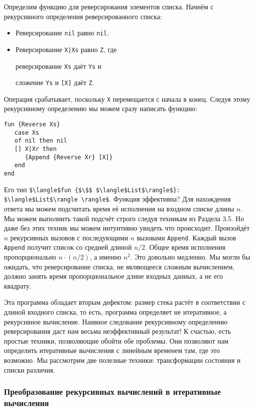 Определим функцию для реверсирования элементов списка. Начнём с рекурсивного определения реверсированного списка:

\begin{itemize}
\item{Реверсирование \lstinline!nil! равно \lstinline!nil!.}

\item{Реверсирование \lstinline!X|Xs! равно \lstinline!Z!, где

  реверсирование \lstinline!Xs! даёт \lstinline!Ys! и

  сложение \lstinline!Ys! и \lstinline![X]! даёт \lstinline!Z!.}
\end{itemize}

Операция срабатывает, поскольку \lstinline!X! перемещается с начала в конец. Следуя этому рекурсивному определению мы можем сразу написать функцию:

\begin{lstlisting}
fun {Reverse Xs}
   case Xs
   of nil then nil
   [] X|Xr then
      {Append {Reverse Xr} [X]}
   end
end
\end{lstlisting}

Его тип \lstinline|$\langle$fun {$\$$ $\langle$List$\rangle$}: $\langle$List$\rangle \rangle$|. Функция эффективна? Для нахождения ответа мы можем подсчитать время её исполнения на входном списке длины $n$. Мы можем выполнить такой подсчёт строго следуя техникам из Раздела 3.5. Но даже без этих техник мы можем интуитивно увидеть что происходит. Произойдёт $n$ рекурсивных вызовов с последующими $n$ вызовами \lstinline!Append!. Каждый вызов \lstinline!Append! получит список со средней длиной $n/2$. Общее время исполнения пропорционально $n \cdot (n/2)$, а именно $n^2$. Это довольно медленно. Мы могли бы ожидать, что реверсирование списка, не являющееся сложным вычислением, должно занять время пропорциональное длине входных данных, а не его квадрату.

Эта программа обладает вторым дефектом: размер стека растёт в соответствии с длиной входного списка, то есть, программа определяет не итеративное, а рекурсивное вычисление. Наивное следование рекурсивному определению реверсирования даст нам весьма неэффективный результат! К счастью, есть простые техники, позволяющие обойти обе проблемы. Они позволяют нам определить итеративные вычисления с линейным временем там, где это возможно. Мы рассмотрим две полезные техники: трансформации состояния и списки различия.

\subsubsection{Преобразование рекурсивных вычислений в итеративные вычисления}

